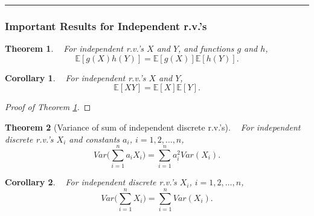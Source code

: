 \documentclass[12pt]{amsart}
\newtheorem{theorem}{Theorem}[section]
\newtheorem{corollary}{Corollary}[theorem]
\begin{document}
{%
\vspace{.5cm}
\hrule

\subsubsection{Important Results for Independent r.v.'s}

\begin{theorem}\label{E_indep_gXhY}\ \newline
For independent r.v.'s $X$ and $Y$, and functions $g$ and $h$,
$$
\mathbb{E}[g(X)h(Y)] = \mathbb{E}[g(X)]\mathbb{E}[h(Y)].
$$ \end{theorem}

\vspace{.1cm}
\begin{corollary}\ \newline
For independent r.v.'s $X$ and $Y$,
$$
\mathbb{E}[XY] = \mathbb{E}[X]\mathbb{E}[Y].
$$ \end{corollary}

\vspace{.1cm}
\begin{proof}[Proof of Theorem \ref{E_indep_gXhY}] 
\end{proof}




\newpage

\begin{theorem}[Variance of sum of independent discrete r.v.'s]\label{ThmVarSum}\ \newline
For independent discrete r.v.'s $X_i$ and constants $a_i$, $i=1,2,\dots, n$, 
$$
Var\Big(\sum_{i=1}^n a_iX_i\Big) = \sum_{i=1}^n a_i^2Var(X_i).
$$ 
\end{theorem}

\vspace{.1cm}
\begin{corollary}\ \newline
For independent discrete r.v.'s $X_i$, $i=1,2,\dots, n$, 
$$
Var\Big(\sum_{i=1}^n X_i\Big) = \sum_{i=1}^n Var(X_i).
$$ 
\end{corollary}


}
\end{document}
